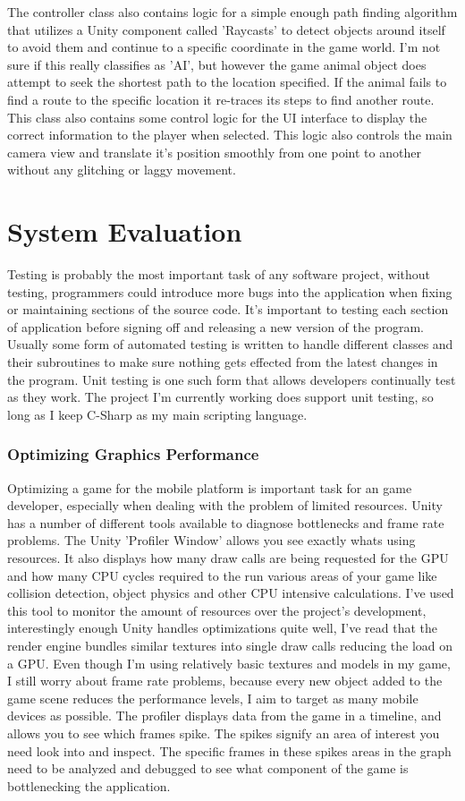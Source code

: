 The controller class also contains logic for a simple enough path finding algorithm that utilizes a Unity component called 'Raycasts' to detect objects around itself to avoid them and continue to a specific coordinate in the game world. I'm not sure if this really classifies as 'AI', but however the game animal object does attempt to seek the shortest path to the location specified. If the animal fails to find a route to the specific location it re-traces its steps to find another route.
This class also contains some control logic for the UI interface to display the correct information to the player when selected. This logic also controls the main camera view and translate it's position smoothly from one point to another without any glitching or laggy movement.
\chapter{System Evaluation}
Testing is probably the most important task of any software project, without testing, programmers could introduce more bugs into the application when fixing or maintaining sections of the source code. It's important to testing each section of application before signing off and releasing a new version of the program. Usually some form of automated testing is written to handle different classes and their subroutines to make sure nothing gets effected from the latest changes in the program. Unit testing is one such form that allows developers continually test as they work. The project I'm currently working does support unit testing, so long as I keep C-Sharp as my main scripting language.
\subsection{Optimizing Graphics Performance}
Optimizing a game for the mobile platform is important task for an game developer, especially when dealing with the problem of limited resources.
Unity has a number of different tools available to diagnose bottlenecks and frame rate problems. The Unity 'Profiler Window' allows you see exactly whats using resources. It also displays how many draw calls are being requested for the GPU and how many CPU cycles required to the run various areas of your game like collision detection, object physics and other CPU intensive calculations. I've used this tool to monitor the amount of resources over the project's development, interestingly enough Unity handles optimizations quite well, I've read that the render engine bundles similar textures into single draw calls reducing the load on a GPU. Even though I'm using relatively basic textures and models in my game, I still worry about frame rate problems, because every new object added to the game scene reduces the performance levels, I aim to target as many mobile devices as possible. The profiler displays data from the game in a timeline, and allows you to see which frames spike. The spikes signify an area of interest you need look into and inspect. The specific frames in these spikes areas in the graph need to be analyzed and debugged to see what component of the game is bottlenecking the application.
